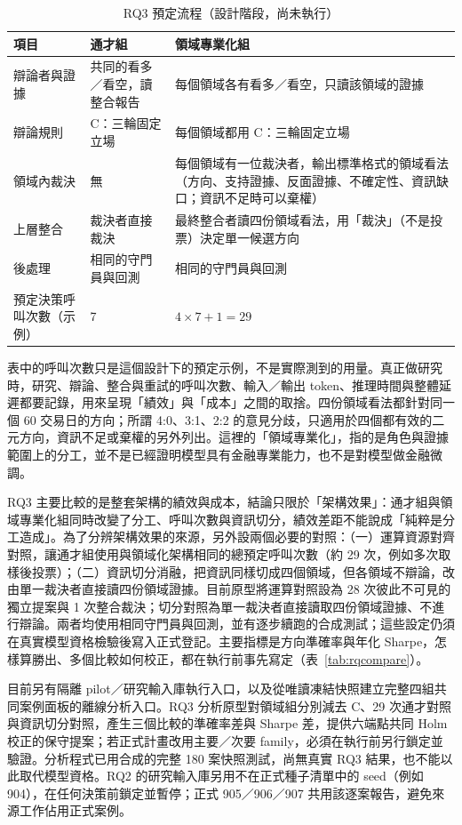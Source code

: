 \begin{table}[H]\centering\small
\caption{RQ3 預定流程（設計階段，尚未執行）}
\label{tab:rq3flow}
\begin{tabularx}{\textwidth}{@{}L{.17} Y Y@{}}\toprule
項目 & 通才組 & 領域專業化組 \\\midrule
辯論者與證據 & 共同的看多／看空，讀整合報告 & 每個領域各有看多／看空，只讀該領域的證據 \\
辯論規則 & C：三輪固定立場 & 每個領域都用 C：三輪固定立場 \\
領域內裁決 & 無 & 每個領域有一位裁決者，輸出標準格式的領域看法（方向、支持證據、反面證據、不確定性、資訊缺口；資訊不足時可以棄權） \\
上層整合 & 裁決者直接裁決 & 最終整合者讀四份領域看法，用「裁決」（不是投票）決定單一候選方向 \\
後處理 & 相同的守門員與回測 & 相同的守門員與回測 \\
預定決策呼叫次數（示例） & 7 & $4\times7+1=29$ \\
\bottomrule\end{tabularx}\end{table}

表中的呼叫次數只是這個設計下的預定示例，不是實際測到的用量。真正做研究時，研究、辯論、整合與重試的呼叫次數、輸入／輸出 token、推理時間與整體延遲都要記錄，用來呈現「績效」與「成本」之間的取捨。四份領域看法都針對同一個 60 交易日的方向；所謂 4:0、3:1、2:2 的意見分歧，只適用於四個都有效的二元方向，資訊不足或棄權的另外列出。這裡的「領域專業化」，指的是角色與證據範圍上的分工，並不是已經證明模型具有金融專業能力，也不是對模型做金融微調。

RQ3 主要比較的是整套架構的績效與成本，結論只限於「架構效果」：通才組與領域專業化組同時改變了分工、呼叫次數與資訊切分，績效差距不能說成「純粹是分工造成」。為了分辨架構效果的來源，另外設兩個必要的對照：（一）運算資源對齊對照，讓通才組使用與領域化架構相同的總預定呼叫次數（約 29 次，例如多次取樣後投票）；（二）資訊切分消融，把資訊同樣切成四個領域，但各領域不辯論，改由單一裁決者直接讀四份領域證據。目前原型將運算對照設為 28 次彼此不可見的獨立提案與 1 次整合裁決；切分對照為單一裁決者直接讀取四份領域證據、不進行辯論。兩者均使用相同守門員與回測，並有逐步續跑的合成測試；這些設定仍須在真實模型資格檢驗後寫入正式登記。主要指標是方向準確率與年化 Sharpe，怎樣算勝出、多個比較如何校正，都在執行前事先寫定（表~\ref{tab:rqcompare}）。

目前另有隔離 pilot／研究輸入庫執行入口，以及從唯讀凍結快照建立完整四組共同案例面板的離線分析入口。RQ3 分析原型對領域組分別減去 C、29 次通才對照與資訊切分對照，產生三個比較的準確率差與 Sharpe 差，提供六端點共同 Holm 校正的保守提案；若正式計畫改用主要／次要 family，必須在執行前另行鎖定並驗證。分析程式已用合成的完整 180 案快照測試，尚無真實 RQ3 結果，也不能以此取代模型資格。RQ2 的研究輸入庫另用不在正式種子清單中的 seed（例如 904），在任何決策前鎖定並暫停；正式 905／906／907 共用該逐案報告，避免來源工作佔用正式案例。

